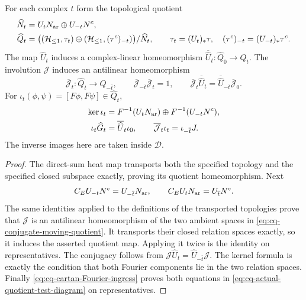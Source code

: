 \begin{cqproposition}
For each complex $t$ form the topological quotient
\begin{equation}
\begin{split}
 \widehat N_t&=U_tN_{\rm ar}\oplus U_{-t}N^c,\\
 \widehat Q_t&=
 \big((\mathcal H_{\leq 1},\tau_t)\oplus(\mathcal H_{\leq 1},(\tau^c)_{-t})\big)/\widehat N_t,
 \qquad \tau_t=(U_t)_*\tau,\quad
 (\tau^c)_{-t}=(U_{-t})_*\tau^c .
\end{split}
\label{eq:cq-conjugate-moving-quotient}
\end{equation}
The map $\widehat U_t$ induces a complex-linear homeomorphism
$\overline{\widehat U}_t:\widehat Q_0\to\widehat Q_t$.
The involution $\mathcal J$ induces an antilinear homeomorphism
\begin{equation}
 \overline{\mathcal J}_t:\widehat Q_t\longrightarrow
       \widehat Q_{-\overline t},\qquad
 \overline{\mathcal J}_{-\overline t}\overline{\mathcal J}_t=1,
 \qquad
 \overline{\mathcal J}_t\overline{\widehat U}_t
 =\overline{\widehat U}_{-\overline t}\overline{\mathcal J}_0 .
 \label{eq:cq-actual-quotient-antiunitary-bridge}
\end{equation}
For $\iota_t(\phi,\psi)=[F\phi,F\psi]\in\widehat Q_t$,
\begin{equation}
\begin{split}
 \ker\iota_t&=F^{-1}(U_tN_{\rm ar})\oplus F^{-1}(U_{-t}N^c),\\
 \iota_t\widehat G_t&=\overline{\widehat U}_t\iota_0,\qquad
 \overline{\mathcal J}_t\iota_t=\iota_{-\overline t}J .
\end{split}
\label{eq:cq-actual-quotient-test-diagram}
\end{equation}
The inverse images here are taken inside $\mathscr D$.
\end{cqproposition}

\begin{proof}
The direct-sum heat map transports both the specified topology
and the specified closed subspace exactly, proving its quotient
homeomorphism. Next
\[
 C_EU_{-t}N^c=U_{-\overline t}N_{\rm ar},\qquad
 C_EU_tN_{\rm ar}=U_{\overline t}N^c .
\]
The same identities applied to the definitions of the transported
topologies prove that $\mathcal J$ is an antilinear homeomorphism
of the two ambient spaces in \eqref{eq:cq-conjugate-moving-quotient}.
It transports their closed relation spaces exactly, so it induces
the asserted quotient map. Applying it twice is the identity
on representatives. The conjugacy follows from
$\mathcal J\widehat U_t=\widehat U_{-\overline t}\mathcal J$.
The kernel formula is exactly the condition that both Fourier
components lie in the two relation spaces. Finally
\eqref{eq:cq-cartan-Fourier-ingress} proves both equations
in \eqref{eq:cq-actual-quotient-test-diagram} on representatives.
\end{proof}

